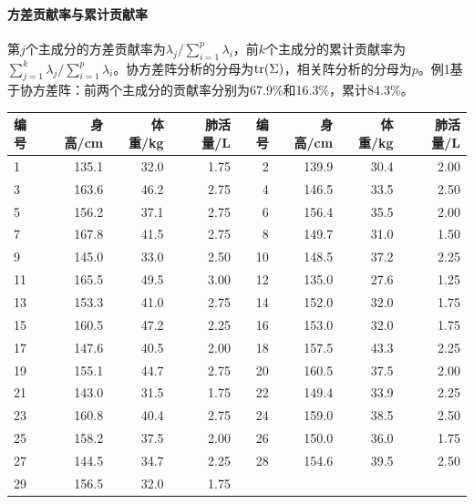 \paragraph{方差贡献率与累计贡献率}
第$j$个主成分的方差贡献率为$\lambda_j/\sum_{i=1}^p\lambda_i$，前$k$个主成分的累计贡献率为$\sum_{j=1}^k\lambda_j/\sum_{i=1}^p\lambda_i$。协方差阵分析的分母为$\operatorname{tr}(\Sigma)$，相关阵分析的分母为$p$。例1基于协方差阵：前两个主成分的贡献率分别为67.9\%和16.3\%，累计84.3\%。
\par\addvspace{5pt}\begin{center}\begin{minipage}{\linewidth}\centering
\small
{}\label{tab:hwv}
\begin{tabular}{lrrrrrrr}\toprule
{\bfseries 编号 }&{\bfseries  身高/cm }&{\bfseries  体重/kg }&{\bfseries  肺活量/L }&{\bfseries  编号 }&{\bfseries  身高/cm }&{\bfseries  体重/kg }&{\bfseries  肺活量/L}\\\midrule
1 & 135.1 & 32.0 & 1.75 & 2 & 139.9 & 30.4 & 2.00\\
3 & 163.6 & 46.2 & 2.75 & 4 & 146.5 & 33.5 & 2.50\\
5 & 156.2 & 37.1 & 2.75 & 6 & 156.4 & 35.5 & 2.00\\
7 & 167.8 & 41.5 & 2.75 & 8 & 149.7 & 31.0 & 1.50\\
9 & 145.0 & 33.0 & 2.50 & 10 & 148.5 & 37.2 & 2.25\\
11 & 165.5 & 49.5 & 3.00 & 12 & 135.0 & 27.6 & 1.25\\
13 & 153.3 & 41.0 & 2.75 & 14 & 152.0 & 32.0 & 1.75\\
15 & 160.5 & 47.2 & 2.25 & 16 & 153.0 & 32.0 & 1.75\\
17 & 147.6 & 40.5 & 2.00 & 18 & 157.5 & 43.3 & 2.25\\
19 & 155.1 & 44.7 & 2.75 & 20 & 160.5 & 37.5 & 2.00\\
21 & 143.0 & 31.5 & 1.75 & 22 & 149.4 & 33.9 & 2.25\\
23 & 160.8 & 40.4 & 2.75 & 24 & 159.0 & 38.5 & 2.50\\
25 & 158.2 & 37.5 & 2.00 & 26 & 150.0 & 36.0 & 1.75\\
27 & 144.5 & 34.7 & 2.25 & 28 & 154.6 & 39.5 & 2.50\\
29 & 156.5 & 32.0 & 1.75 &  &  &  & \\
\bottomrule\end{tabular}
\end{minipage}\end{center}

